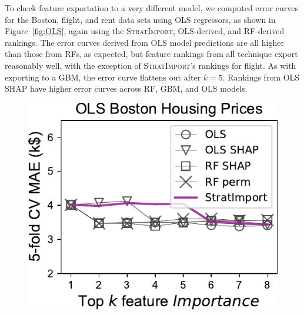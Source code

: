 \documentclass[11pt]{article}
\newcommand{\figref}[1]{Figure~\ref{#1}}
\newcommand{\simpo}{\fontfamily{cmr}\textsc{\small StratImport}}
\begin{document}
To check feature exportation to a very different model, we computed error curves for the Boston, flight, and rent data sets using OLS regressors, as shown in \figref{fig:OLS}, again using the \simpo{}, OLS-derived, and RF-derived rankings.  The error curves derived from OLS model predictions are all higher than those from RFs, as expected, but feature rankings from all technique export reasonably well, with the exception of \simpo's rankings for flight. As with exporting to a GBM, the error curve flattens out after $k=5$. Rankings from OLS SHAP have higher error curves across RF, GBM, and OLS models.

\begin{figure}[htbp]
\begin{center}
\includegraphics[scale=0.5]{images/boston-topk-OLS-Importance.pdf}~~~

\end{center}
\end{figure}
\end{document}
